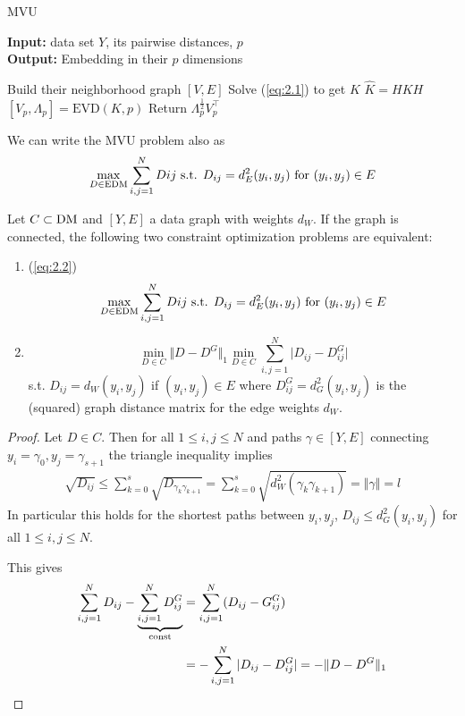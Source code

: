 \begin{algorithm}[H] 
    \caption{MVU}\label{alg:mvu}
 \textbf{Input:}  data set $Y$, its pairwise distances, $p$\\
 \textbf{Output:} Embedding in their $p$ dimensions
 \begin{algorithmic}
    \State Build their neighborhood graph $[V,E]$
   \State Solve (\ref{eq:2.1}) to get $K$
   \State $\hat{K}=HKH$
   \State $[V_p,\Lambda_p]=\text{EVD}(K,p)$
   \State Return $\Lambda_p^{\frac{1}{2}} V_p^\intercal$
 \end{algorithmic}
\end{algorithm}

We can write the MVU problem also as 
\begin{eqnarray}
    \max_{D\in \text{EDM}}\sum_{i,j=1}^N D{ij}\text{ s.t. }D_{ij}=d_E^2(y_i,y_j)\text{ for } (y_i,y_j)\in E\label{eq:2.2}  
\end{eqnarray}

\begin{theorem}\label{thm:2.17}
    Let $C\subset\text{DM}$ and $[Y,E]$ a data graph with weights $d_W$. If the graph is connected,
    the following two constraint optimization problems are equivalent:
    \begin{enumerate}
        \item (\ref{eq:2.2})\[\max_{D\in \text{EDM}}\sum_{i,j=1}^N D{ij}\text{ s.t. }D_{ij}=d_E^2(y_i,y_j)\text{ for } (y_i,y_j)\in E\]
        \item \begin{equation}\min_{D\in C}\Vert D-D^G\Vert_1  \min_{D\in C}\sum_{i,j=1}^N\vert D_{ij}-D_{ij}^G\vert\label{eq:2.3}\end{equation} s.t. $D_{ij}=d_W(y_i,y_j)$ if $(y_i,y_j)\in E$
            where $D_{ij}^G=d_G^2(y_i,y_j)$ is the (squared) graph distance matrix for the edge weights $d_W$. 
    \end{enumerate}
\end{theorem}

\begin{proof}
    Let $D\in C$. Then for all $1\leq i,j\leq N$ and paths $\gamma\in[Y,E]$ connecting 
    $y_i=\gamma_0,y_j=\gamma_{s+1}$ the triangle inequality implies 
    \begin{align*}
        \sqrt{D_{ij}}\leq \sum_{k=0}^s\sqrt{D_{\gamma_k\gamma_{k+1}}}=\sum_{k=0}^s\sqrt{d_W^2(\gamma_k\gamma_{k+1})}=\Vert\gamma\Vert =l
    \end{align*}
    In particular this holds for the shortest paths between $y_i,y_j$, $D_{ij}\leq d_G^2(y_i,y_j)$ for all $1\leq i,j\leq N$.

    This gives \begin{align*}
        \sum_{i,j=1}^N D_{ij}-\underbrace{\sum_{i,j=1}^N D_{ij}^G}_{\text{const}}&=\sum_{i,j=1}^N(D_{ij}-G_{ij}^G)\\
        &=-\sum_{i,j=1}^N \vert D_{ij}-D_{ij}^G\vert =-\Vert D-D^G\Vert_1 \qedhere
    \end{align*}

\end{proof}

